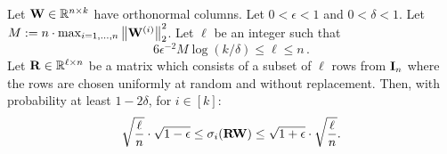 \begin{lemma}
\label{ch3:lemma:sampling-ortho}
Let $\mathbf{W} \in \mathbb{R}^{n \times k}$ have orthonormal columns.
Let $0 < \epsilon < 1$ and $0 < \delta < 1$. Let $ M:= n \cdot 
     \max\nolimits_{i=1,...,n} \left\|\mathbf{W}^{(i)}\right\|_2^2$.
Let $\ell$ be an integer such that
\begin{equation}\label{ch3:eqn:r3}
6 \epsilon^{-2} M \log (k/\delta) \leq \ell \leq n \,.
\end{equation}
Let $\mathbf{R} \in \mathbb{R}^{\ell \times n}$ be a matrix which consists of a subset of $\ell$ 
rows from $\mathbf{I}_n$ where the rows are  chosen uniformly at random and without
replacement. Then, with probability at least $1-2\delta$, for $i\in[k]$:
$$ \sqrt{\frac{\ell}{n}} \cdot \sqrt{1-\epsilon} \le \sigma_i( \mathbf{R} \mathbf{W}) \le
\sqrt{1+\epsilon} \cdot \sqrt{\frac{\ell}{n}} .$$
\end{lemma}
%
% 
% 

